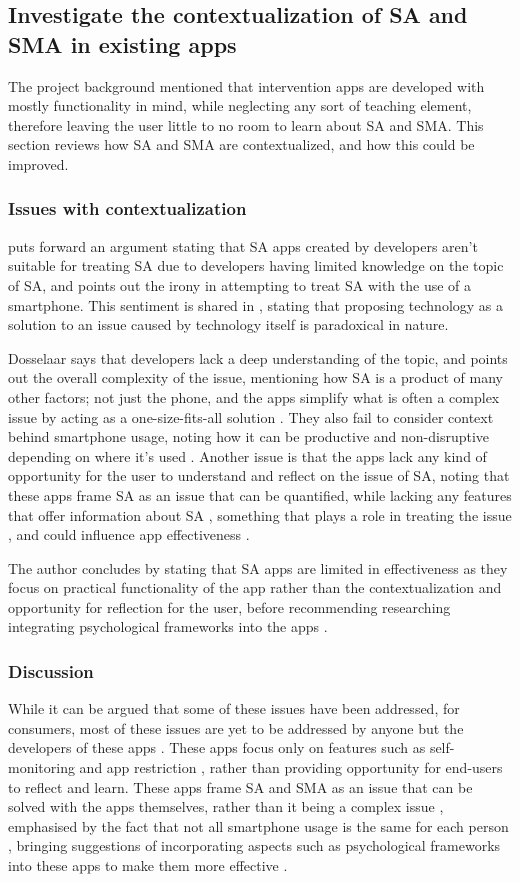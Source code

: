\documentclass[12pt]{article}
\begin{document}
\subsection{Investigate the contextualization of SA and SMA in existing apps}
The project background mentioned that intervention apps are developed with
mostly functionality in mind, while neglecting any sort of teaching element, therefore leaving the user little to 
no room to learn about SA and SMA. This section reviews how SA and SMA are contextualized, and
how this could be improved.

\subsubsection{Issues with contextualization}
 puts forward an argument stating that 
SA apps created by developers aren't suitable for treating SA due to developers having limited knowledge on the
topic of SA, and points out the irony in attempting to treat SA with the use of a smartphone. This sentiment is 
shared in , stating that proposing technology as a solution to 
an issue caused by technology itself is paradoxical in nature. \newline

Dosselaar says that developers lack a deep understanding of the topic, and points out the overall complexity of the issue, 
mentioning how SA is a product of many other factors; not just the phone, and the apps simplify what is often a complex 
issue by acting as a one-size-fits-all solution . 
They also fail to consider context behind smartphone usage, noting how it can be productive 
 and non-disruptive depending on where it's used 
. Another issue is that the apps lack any kind of opportunity
for the user to understand and reflect on the issue of SA, noting that these apps frame
SA as an issue that can be quantified, while lacking any features that offer information about SA 
, something that plays a role in treating the issue 
, and could influence app effectiveness 
.\newline

The author concludes by stating that SA apps are limited in effectiveness as they focus on practical
functionality of the app rather than the contextualization and opportunity for reflection for the user, before
recommending researching integrating psychological frameworks into the apps
.

\subsubsection{Discussion}
While it can be argued that some of these issues have been addressed, for consumers, most of
these issues are yet to be addressed by anyone but the developers of these apps 
. These apps focus only on features
such as self-monitoring and app restriction , rather than 
providing opportunity for end-users to reflect and learn. These apps frame SA and SMA as an issue 
that can be solved with the apps themselves, rather than it being a complex issue
, emphasised by the fact that not all smartphone usage 
is the same for each person , bringing suggestions of
incorporating aspects such as psychological frameworks into these apps to make them more effective 
.
\end{document}
